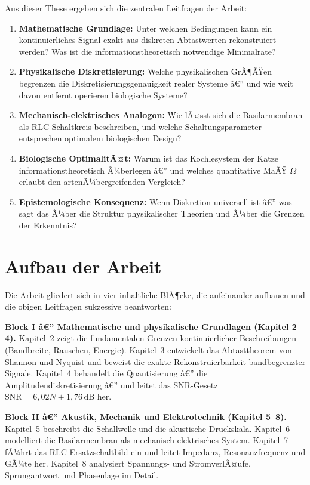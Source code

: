 ﻿\documentclass[12pt,a4paper,titlepage]{report}
\begin{document}
Aus dieser These ergeben sich die zentralen Leitfragen der Arbeit:

\begin{enumerate}[leftmargin=2em, label=\textbf{F\arabic*.}]
	\item \textbf{Mathematische Grundlage:}
		Unter welchen Bedingungen kann ein kontinuierliches Signal
		exakt aus diskreten Abtastwerten rekonstruiert werden?
		Was ist die informationstheoretisch notwendige Minimalrate?
	\item \textbf{Physikalische Diskretisierung:}
		Welche physikalischen GrÃ¶ÃŸen begrenzen die Diskretisierungsgenauigkeit
		realer Systeme â€” und wie weit davon entfernt operieren
		biologische Systeme?
	\item \textbf{Mechanisch-elektrisches Analogon:}
		Wie lÃ¤sst sich die Basilarmembran als RLC-Schaltkreis
		beschreiben, und welche Schaltungsparameter entsprechen
		optimalem biologischen Design?
	\item \textbf{Biologische OptimalitÃ¤t:}
		Warum ist das Kochlesystem der Katze informationstheoretisch
		Ã¼berlegen â€” und welches quantitative MaÃŸ $\Omega$ erlaubt
		den artenÃ¼bergreifenden Vergleich?
	\item \textbf{Epistemologische Konsequenz:}
		Wenn Diskretion universell ist â€” was sagt das Ã¼ber die Struktur
		physikalischer Theorien und Ã¼ber die Grenzen der Erkenntnis?
\end{enumerate}

\section{Aufbau der Arbeit}

Die Arbeit gliedert sich in vier inhaltliche BlÃ¶cke, die aufeinander aufbauen
und die obigen Leitfragen sukzessive beantworten:

\medskip
\noindent\textbf{Block I â€” Mathematische und physikalische Grundlagen
(Kapitel 2--4).}
Kapitel~2 zeigt die fundamentalen Grenzen kontinuierlicher Beschreibungen
(Bandbreite, Rauschen, Energie).
Kapitel~3 entwickelt das Abtasttheorem von Shannon und Nyquist und beweist
die exakte Rekonstruierbarkeit bandbegrenzter Signale.
Kapitel~4 behandelt die Quantisierung â€” die Amplitudendiskretisierung â€”
und leitet das SNR-Gesetz $\mathrm{SNR} = 6{,}02N + 1{,}76\,\mathrm{dB}$
her.

\medskip
\noindent\textbf{Block II â€” Akustik, Mechanik und Elektrotechnik
(Kapitel 5--8).}
Kapitel~5 beschreibt die Schallwelle und die akustische Druckskala.
Kapitel~6 modelliert die Basilarmembran als mechanisch-elektrisches System.
Kapitel~7 fÃ¼hrt das RLC-Ersatzschaltbild ein und leitet Impedanz,
Resonanzfrequenz und GÃ¼te her.
Kapitel~8 analysiert Spannungs- und StromverlÃ¤ufe, Sprungantwort und
Phasenlage im Detail.
\end{document}
